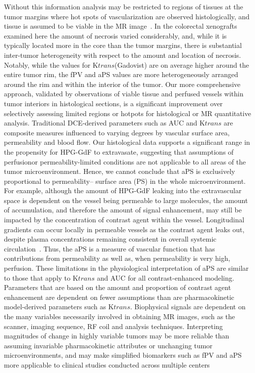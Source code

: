 Without this information analysis may be restricted to regions of tissues at the tumor margins where hot spots of vascularization are observed histologically, and tissue is assumed to be viable in the MR image~\cite{Pathak:2005gu,Li:2005gw}.
In the colorectal xenografts examined here the amount of necrosis varied considerably, and, while it is typically located more in the core than the tumor margins, there is substantial inter-tumor heterogeneity with respect to the amount and location of necrosis.
Notably, while the values for K${trans}$(Gadovist) are on average higher around the entire tumor rim, the fPV and aPS values are more heterogeneously arranged around the rim and within the interior of the tumor.
Our more comprehensive approach, validated by observations of viable tissue and perfused vessels within tumor interiors in histological sections, is a significant improvement over selectively assessing limited regions or hotpots for histological or MR quantitative analysis.
Traditional DCE-derived parameters such as AUC and K${trans}$ are composite measures influenced to varying degrees by vascular surface area, permeability and blood flow.
Our histological data supports a significant range in the propensity for HPG-GdF to extravasate, suggesting that assumptions of perfusionor permeability-limited conditions are not applicable to all areas of the tumor microenvironment.
Hence, we cannot conclude that aPS is exclusively proportional to permeability– surface area (PS) in the whole microenvironment.
For example, although the amount of HPG-GdF leaking into the extravascular space is dependent on the vessel being permeable to large molecules, the amount of accumulation, and therefore the amount of signal enhancement, may still be impacted by the concentration of contrast agent within the vessel.
Longitudinal gradients can occur locally in permeable vessels as the contrast agent leaks out, despite plasma concentrations remaining consistent in overall systemic circulation~\cite{Erickson:2003wt,Dewhirst:1999jh}.
Thus, the aPS is a measure of vascular function that has contributions from permeability as well as, when permeability is very high, perfusion.
These limitations in the physiological interpretation of aPS are similar to those that apply to K${trans}$ and AUC for all contrast-enhanced modeling.
Parameters that are based on the amount and proportion of contrast agent enhancement are dependent on fewer assumptions than are pharmacokinetic model-derived parameters such as K${trans}$.
Biophysical signals are dependent on the many variables necessarily involved in obtaining MR images, such as the scanner, imaging sequence, RF coil and analysis techniques.
Interpreting magnitudes of change in highly variable tumors may be more reliable than assuming invariable pharmacokinetic attributes or unchanging tumor microenvironments, and may make simplified biomarkers such as fPV and aPS more applicable to clinical studies conducted across multiple centers~\cite{OConnor:2012ie}

